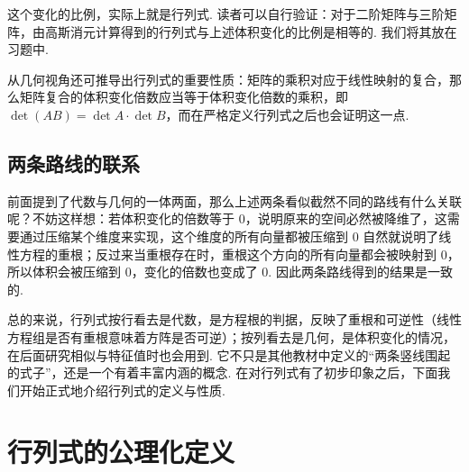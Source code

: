 这个变化的比例，实际上就是行列式. 读者可以自行验证：对于二阶矩阵与三阶矩阵，由高斯消元计算得到的行列式与上述体积变化的比例是相等的. 我们将其放在习题中.

从几何视角还可推导出行列式的重要性质：矩阵的乘积对应于线性映射的复合，那么矩阵复合的体积变化倍数应当等于体积变化倍数的乘积，即 $\det(AB) = \det A \cdot \det B$，而在严格定义行列式之后也会证明这一点.


\subsection{两条路线的联系}

前面提到了代数与几何的一体两面，那么上述两条看似截然不同的路线有什么关联呢？不妨这样想：若体积变化的倍数等于 $0$，说明原来的空间必然被降维了，这需要通过压缩某个维度来实现，这个维度的所有向量都被压缩到 $0$ 自然就说明了线性方程的重根；反过来当重根存在时，重根这个方向的所有向量都会被映射到 $0$，所以体积会被压缩到 $0$，变化的倍数也变成了 $0$. 因此两条路线得到的结果是一致的.



总的来说，行列式按行看去是代数，是方程根的判据，反映了重根和可逆性（线性方程组是否有重根意味着方阵是否可逆）；按列看去是几何，是体积变化的情况，在后面研究相似与特征值时也会用到. 它不只是其他教材中定义的``两条竖线围起的式子''，还是一个有着丰富内涵的概念. 在对行列式有了初步印象之后，下面我们开始正式地介绍行列式的定义与性质.

\section{行列式的公理化定义}

